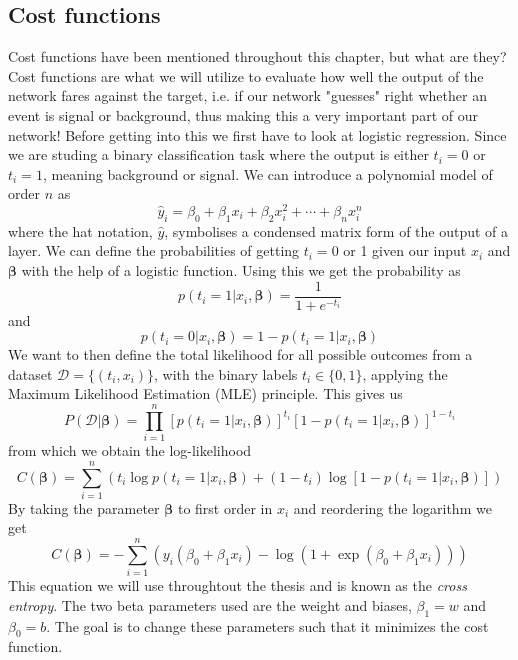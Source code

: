 \documentclass[12pt, a4paper]{book}
\begin{document}
\subsection{Cost functions}\label{sec:cost_func}
Cost functions have been mentioned throughout this chapter, but what are they? Cost functions are what we will utilize to evaluate how well the output of the network fares against the target, i.e. if our network "guesses" right whether an event is signal or background, 
thus making this a very important part of our network! Before getting into this we first have to look at logistic regression. Since we are studing a binary classification task where the output is either $t_i=0$ or $t_i = 1$, meaning background or signal. 
We can introduce a polynomial model of order $n$ as
$$
\hat{y}_i=\beta_0+\beta_1x_i+\beta_2x_i^2+\cdots+\beta_nx_i^n
$$
where the hat notation, $\hat y$, symbolises a condensed matrix form of the output of a layer. We can define the probabilities of getting $t_i=0$ or 1 given our input $x_i$ and $\bm{\beta}$ with the help of a logistic function. 
Using this we get the probability as
$$
p(t_i=1\vert x_i,\bm{\beta})=\frac{1}{1+e^{-t_i}}
$$
and
$$
p(t_i=0\vert x_i,\bm{\beta})=1- p(t_i=1\vert x_i,\bm{\beta})
$$
We want to then define the total likelihood for all possible outcomes from a dataset $\mathcal{D}=\{(t_i,x_i)\}$, with the binary labels $t_i\in\{0,1\}$, applying the Maximum Likelihood Estimation (MLE) principle. 
This gives us
$$
P(\mathcal{D}\vert\bm{\beta})=\prod_{i=1}^n\left[p(t_i=1\vert x_i,\bm{\beta})\right]^{t_i}\left[1-p(t_i=1\vert x_i,\bm{\beta})\right]^{1-t_i}
$$
from which we obtain the log-likelihood
$$
C(\bm{\beta})=\sum_{i=1}^n\left(t_i\log p(t_i=1\vert x_i,\bm{\beta})+(1-t_i)\log[1-p(t_i=1\vert x_i,\bm{\beta})]\right)
$$
By taking the parameter $\bm{\beta}$ to first order in $x_i$ and reordering the logarithm we get
\begin{equation}\label{eq:CrossEntropy}
    C(\bm{\beta})=-\sum_{i=1}^n(y_i(\beta_0+\beta_1x_i)-\log(1+\exp(\beta_0+\beta_1x_i)))
\end{equation}
This equation we will use throughtout the thesis and is known as the \textit{cross entropy}. The two beta parameters used are the weight and biases, $\beta_1 = w$ and $\beta_0 = b$. The goal is to change these parameters such that it minimizes the cost function. 
\end{document}
